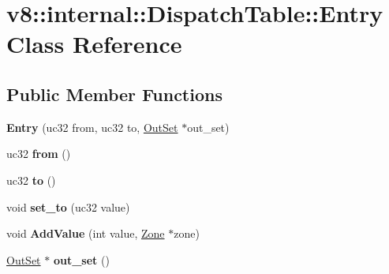 \hypertarget{classv8_1_1internal_1_1_dispatch_table_1_1_entry}{}\section{v8\+:\+:internal\+:\+:Dispatch\+Table\+:\+:Entry Class Reference}
\label{classv8_1_1internal_1_1_dispatch_table_1_1_entry}
\subsection*{Public Member Functions}
\begin{DoxyCompactItemize}
\item 
{\bfseries Entry} (uc32 from, uc32 to, \hyperlink{classv8_1_1internal_1_1_out_set}{Out\+Set} $\ast$out\+\_\+set)\hypertarget{classv8_1_1internal_1_1_dispatch_table_1_1_entry_aaa7ddd692c547254688aeb3020ff1fb1}{}\label{classv8_1_1internal_1_1_dispatch_table_1_1_entry_aaa7ddd692c547254688aeb3020ff1fb1}

\item 
uc32 {\bfseries from} ()\hypertarget{classv8_1_1internal_1_1_dispatch_table_1_1_entry_aa240b5eee35d2b7ce9629f3a4f18a206}{}\label{classv8_1_1internal_1_1_dispatch_table_1_1_entry_aa240b5eee35d2b7ce9629f3a4f18a206}

\item 
uc32 {\bfseries to} ()\hypertarget{classv8_1_1internal_1_1_dispatch_table_1_1_entry_a381bd5583e5270f9fe9ffafd7fd7c1dc}{}\label{classv8_1_1internal_1_1_dispatch_table_1_1_entry_a381bd5583e5270f9fe9ffafd7fd7c1dc}

\item 
void {\bfseries set\+\_\+to} (uc32 value)\hypertarget{classv8_1_1internal_1_1_dispatch_table_1_1_entry_a153e03e949110733bcc4b59b6dea4ca1}{}\label{classv8_1_1internal_1_1_dispatch_table_1_1_entry_a153e03e949110733bcc4b59b6dea4ca1}

\item 
void {\bfseries Add\+Value} (int value, \hyperlink{classv8_1_1internal_1_1_zone}{Zone} $\ast$zone)\hypertarget{classv8_1_1internal_1_1_dispatch_table_1_1_entry_a8fa8b735da68812c171572d669c6965e}{}\label{classv8_1_1internal_1_1_dispatch_table_1_1_entry_a8fa8b735da68812c171572d669c6965e}

\item 
\hyperlink{classv8_1_1internal_1_1_out_set}{Out\+Set} $\ast$ {\bfseries out\+\_\+set} ()\hypertarget{classv8_1_1internal_1_1_dispatch_table_1_1_entry_ad0ba8c0ec934677a57c37f6f4eb9b1b0}{}\label{classv8_1_1internal_1_1_dispatch_table_1_1_entry_ad0ba8c0ec934677a57c37f6f4eb9b1b0}

\end{DoxyCompactItemize}
